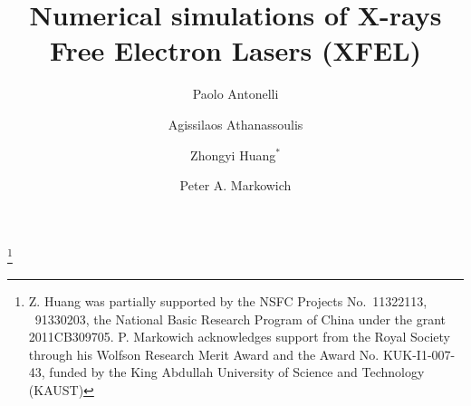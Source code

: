 \documentclass[10pt, leqno]{amsart}
\begin{document}
\newtheorem{theorem}{Theorem}[section]
\newtheorem{lemma}{Lemma}[section]
\newtheorem{observation}{Observation}[section]
\newtheorem{definition}{Definition}[section]
\newtheorem{corollary}{Corollary}[section]
\newtheorem{assumption}{Assumption}[section]
\newtheorem{property}{Property}[section]
\newtheorem{remark}{Remark}[section]
\newtheorem{example}{Example}[section]




\title{Numerical simulations of  X-rays Free Electron Lasers (XFEL)}
\thanks{Z. Huang was partially supported by the
NSFC Projects No.~11322113, ~91330203, the National Basic Research Program of
China under the grant 2011CB309705. P. Markowich
acknowledges support from the Royal Society through his Wolfson
Research Merit Award and the Award No. KUK-I1-007-43, funded by the
King Abdullah University of Science and Technology (KAUST)}

\author[P. Antonelli]{Paolo Antonelli}
\address[P. Antonelli]
{Centro di Ricerca Matematica Ennio De Giorgi, Scuola Normale Superiore, Piazza dei Cavalieri, 3, 56100 Pisa, Italy}

\author[A. Athanassoulis]{Agissilaos Athanassoulis}
\address[A. Athanassoulis]
{Department of
Applied Mathematics, University of Crete, Heraklion 71409, Greece}

\author[Z.Y. Huang]{Zhongyi Huang$^*$}
\address[Z.Y. Huang]
{Dept. of Mathematical Sciences, Tsinghua University, Beijing
100084, China}

\author[P. Markowich]{Peter A. Markowich}
\address[P. Markowich]
{King Abdullah University of Science and Technology (KAUST), MCSE
Division, Thuwal 23955-6900, Saudi Arabia}
\end{document}
